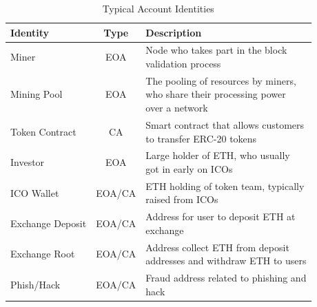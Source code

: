 \begin{table}[t]
\caption{Typical Account Identities}
\begin{center}
\begin{tabular}{|l|c|l|}
\hline
\textbf{Identity} & \textbf{Type}& \textbf{Description} \\
\hline
Miner & EOA & \tabincell{l}{Node who takes part in the block \\validation process} \\ \hline
Mining Pool & EOA & \tabincell{l}{The pooling of resources by miners, \\who share their processing power \\over a network}\\ \hline
Token Contract & CA & \tabincell{l}{Smart contract that allows customers \\to transfer ERC-20 tokens} \\ \hline
Investor & EOA & \tabincell{l}{Large holder of ETH, who usually \\got in early on ICOs} \\ \hline
ICO Wallet & EOA/CA & \tabincell{l}{ETH holding of token team, typically \\raised from ICOs} \\ \hline
Exchange Deposit & EOA/CA & \tabincell{l}{Address for user to deposit ETH at \\exchange} \\ \hline
Exchange Root & EOA/CA & \tabincell{l}{Address collect ETH from deposit \\addresses and withdraw ETH to users} \\ \hline
Phish/Hack & EOA/CA & \tabincell{l}{Fraud address related to phishing and \\hack} \\ \hline
\end{tabular}
\label{table:identity}
\end{center}
\end{table}






